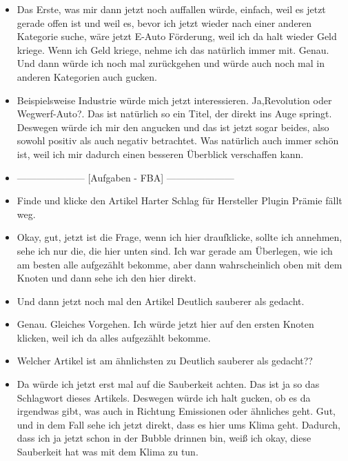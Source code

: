 {\begin{itemize}[]
        \item {} Das Erste, was mir dann jetzt noch auffallen würde, einfach, weil es jetzt gerade offen ist und weil es, bevor ich jetzt wieder nach einer anderen Kategorie suche, wäre jetzt \flqq E-Auto Förderung\frqq{}, weil ich da halt wieder Geld kriege.
              Wenn ich Geld kriege, nehme ich das natürlich immer mit.
              Genau.
              Und dann würde ich noch mal zurückgehen und würde auch noch mal in anderen Kategorien auch gucken.
        \item {} Beispielsweise Industrie würde mich jetzt interessieren.
              Ja,\flqq Revolution oder Wegwerf-Auto?\frqq{}.
              Das ist natürlich so ein Titel, der direkt ins Auge springt.
              Deswegen würde ich mir den angucken und das ist jetzt sogar beides, also sowohl positiv als auch negativ betrachtet.
              Was natürlich auch immer schön ist, weil ich mir dadurch einen besseren Überblick verschaffen kann.
        \item {---------------------} [Aufgaben - FBA] {---------------------}
        \item {} Finde und klicke den Artikel \flqq Harter Schlag für Hersteller Plugin Prämie fällt weg\frqq{}.
        \item {} Okay, gut, jetzt ist die Frage, wenn ich hier draufklicke, sollte ich annehmen, sehe ich nur die, die hier unten sind.
              Ich war gerade am Überlegen, wie ich am besten alle aufgezählt bekomme, aber dann wahrscheinlich oben mit dem Knoten und dann sehe ich den hier direkt.
        \item {} Und dann jetzt noch mal den Artikel \flqq Deutlich sauberer als gedacht\frqq{}.
        \item {} Genau. Gleiches Vorgehen. Ich würde jetzt hier auf den ersten Knoten klicken, weil ich da alles aufgezählt bekomme.
        \item {} Welcher Artikel ist am ähnlichsten zu \flqq Deutlich sauberer als gedacht?\frqq{}?
        \item {} Da würde ich jetzt erst mal auf die Sauberkeit achten.
              Das ist ja so das Schlagwort dieses Artikels.
              Deswegen würde ich halt gucken, ob es da irgendwas gibt, was auch in Richtung Emissionen oder ähnliches geht.
              Gut, und in dem Fall sehe ich jetzt direkt, dass es hier ums Klima geht.
              Dadurch, dass ich ja jetzt schon in der Bubble drinnen bin, weiß ich okay, diese Sauberkeit hat was mit dem Klima zu tun.

\end{itemize}}
